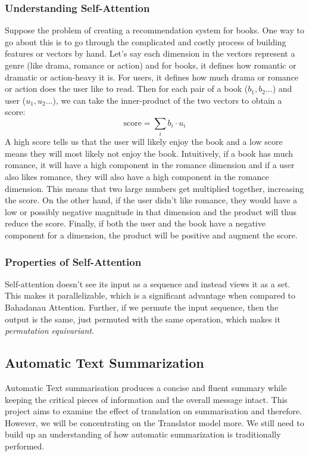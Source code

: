 \documentclass[12pt,a4paper,twoside,openright]{report}
\begin{document}
\subsubsection{Understanding Self-Attention}
Suppose the problem of creating a recommendation system for books. One way to go about this is to go through the complicated and costly process of building features or vectors by hand. Let's say each dimension in the vectors represent a genre (like drama, romance or action) and for books, it defines how romantic or dramatic or action-heavy it is. For users, it defines how much drama or romance or action does the user like to read. Then for each pair of a book ($b_1, b_2...$) and user ($u_1, u_2...$), we can take the inner-product of the two vectors to obtain a score: 
\[ \text{score} = \sum_i b_i \cdot u_i \]
A high score tells us that the user will likely enjoy the book and a low score means they will most likely not enjoy the book. Intuitively, if a book has much romance, it will have a high component in the romance dimension and if a user also likes romance, they will also have a high component in the romance dimension. This means that two large numbers get multiplied together, increasing the score. On the other hand, if the user didn't like romance, they would have a low or possibly negative magnitude in that dimension and the product will thus reduce the score. Finally, if both the user and the book have a negative component for a dimension, the product will be positive and augment the score.

\subsubsection{Properties of Self-Attention}
Self-attention doesn't see its input as a sequence and instead views it as a set. This makes it parallelizable, which is a significant advantage when compared to Bahadanau Attention. Further, if we permute the input sequence, then the output is the same, just permuted with the same operation, which makes it \textit{permutation equivariant}. 



\subsection{Automatic Text Summarization}
\label{auto-text-summarization}
Automatic Text summarisation produces a concise and fluent summary while keeping the critical pieces of information and the overall message intact. This project aims to examine the effect of translation on summarisation and therefore. However, we will be concentrating on the Translator model more. We still need to build up an understanding of how automatic summarization is traditionally performed.
\end{document}
